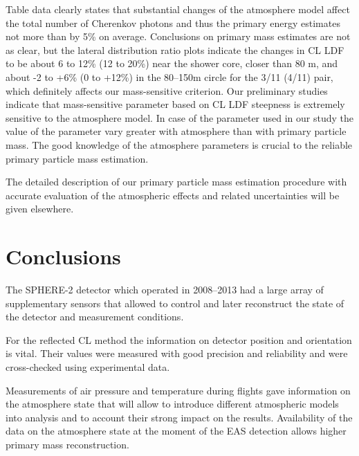 \documentclass[universe,article,submit,moreauthors,pdftex]{Definitions/mdpi}
\begin{document}

Table data clearly states that substantial changes of the atmosphere model affect the total number of Cherenkov photons and thus the primary energy estimates not more than by 5\% on average. Conclusions on primary mass estimates are not as clear, but the lateral distribution ratio plots indicate the changes in CL LDF to be about 6 to 12\% (12 to 20\%) near the shower core, closer than 80 m, and about -2 to +6\% (0 to +12\%) in the 80--150m circle for the 3/11 (4/11) pair, which definitely affects our mass-sensitive criterion. Our preliminary studies indicate that mass-sensitive parameter based on CL LDF steepness is extremely sensitive to the atmosphere model. In case of the parameter used in our study the value of the parameter vary greater with atmosphere than with primary particle mass. The good knowledge of the atmosphere parameters is crucial to the reliable primary particle mass estimation.

The detailed description of our primary particle mass estimation procedure with accurate evaluation of the atmospheric effects and related uncertainties will be given elsewhere. 


\section{Conclusions \label{sect:conclusions}}
The SPHERE-2 detector which operated in 2008--2013 had a large array of supplementary sensors that allowed to control and later reconstruct the state of the detector and measurement conditions. 

For the reflected CL method the information on detector position and orientation is vital. Their values were measured with good precision and reliability and were cross-checked using experimental data.

Measurements of air pressure and temperature during flights gave information on the atmosphere state that will allow to introduce different atmospheric models into analysis and to account their strong impact on the results. Availability of the data on the atmosphere state at the moment of the EAS detection allows higher primary mass reconstruction.
\end{document}

